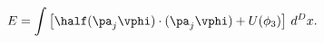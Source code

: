 \begin{equation}\label{LLenergy}
E=\int \left[\half(\pa_j\vphi)\cdot(\pa_j\vphi)+U(\phi_3)\right]\,d^Dx.
\end{equation}

